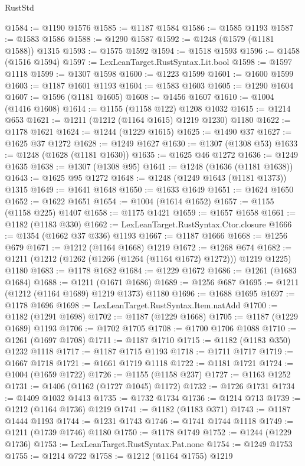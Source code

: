 \begin{lexlean}{RustStd}
\begin{coremodule}
{\begin{coremodule}
{{{{{{{{{{{{{{{{{{{{{{{{{{{{{{{{@1584 := @1190 @1576
@1585 := @1187 @1584
@1586 := @1585 @1193
@1587 := @1583 @1586
@1588 := @1290 @1587
@1592 := @1248 (@1579 (@1181 @1588)) @1315
@1593 := @1575 @1592
@1594 := @1518 @1593
@1596 := @1458 (@1516 @1594)
@1597 := LexLeanTarget.RustSyntax.Lit.bool
@1598 := @1597 @1118
@1599 := @1307 @1598
@1600 := @1223 @1599
@1601 := @1600 @1599
@1603 := @1187 @1601 @1193
@1604 := @1583 @1603
@1605 := @1290 @1604
@1607 := @1596 (@1181 @1605)
@1608 := @1456 @1607
@1610 := @1004 (@1416 @1608)
@1614 := @1155 (@1158 @122) @1208 @1032
@1615 := @1214 @653
@1621 := @1211 (@1212 (@1164 @1615) @1219 @1230) @1180
@1622 := @1178 @1621
@1624 := @1244 (@1229 @1615)
@1625 := @1490 @37
@1627 := @1625 @37 @1272
@1628 := @1249 @1627
@1630 := @1307 (@1308 @53)
@1633 := @1248 (@1628 (@1181 @1630))
@1635 := @1625 @46 @1272
@1636 := @1249 @1635
@1638 := @1307 (@1308 @95)
@1641 := @1248 (@1636 (@1181 @1638))
@1643 := @1625 @95 @1272
@1648 := @1248 (@1249 @1643 (@1181 @1373)) @1315
@1649 := @1641 @1648
@1650 := @1633 @1649
@1651 := @1624 @1650
@1652 := @1622 @1651
@1654 := @1004 (@1614 @1652)
@1657 := @1155 (@1158 @225) @1407
@1658 := @1175 @1421
@1659 := @1657 @1658
@1661 := @1182 (@1183 @330)
@1662 := LexLeanTarget.RustSyntax.Ctor.closure
@1666 := @1354 (@1662 @37 @336) @1193
@1667 := @1187 @1666
@1668 := @1256 @679
@1671 := @1212 (@1164 @1668) @1219
@1672 := @1268 @674
@1682 := @1211 (@1212 (@1262 (@1266 (@1264 (@1164 @1672) @1272))) @1219 @1225) @1180
@1683 := @1178 @1682
@1684 := @1229 @1672
@1686 := @1261 (@1683 @1684)
@1688 := @1211 (@1671 @1686)
@1689 := @1256 @687
@1695 := @1211 (@1212 (@1164 @1689) @1219 @1373) @1180
@1696 := @1688 @1695
@1697 := @1178 @1696
@1698 := LexLeanTarget.RustSyntax.Item.natAdd
@1700 := @1182 (@1291 @1698)
@1702 := @1187 (@1229 @1668)
@1705 := @1187 (@1229 @1689) @1193
@1706 := @1702 @1705
@1708 := @1700 @1706 @1088
@1710 := @1261 (@1697 @1708)
@1711 := @1187 @1710
@1715 := @1182 (@1183 @350) @1232 @1118
@1717 := @1187 @1715 @1193
@1718 := @1711 @1717
@1719 := @1667 @1718
@1721 := @1661 @1719 @1118
@1722 := @1181 @1721
@1724 := @1004 (@1659 @1722)
@1726 := @1155 (@1158 @237)
@1727 := @1163 @1252
@1731 := @1406 (@1162 (@1727 @1045) @1172)
@1732 := @1726 @1731
@1734 := @1409 @1032 @1413
@1735 := @1732 @1734
@1736 := @1214 @713
@1739 := @1212 (@1164 @1736) @1219
@1741 := @1182 (@1183 @371)
@1743 := @1187 @1444 @1193
@1744 := @1231 @1743
@1746 := @1741 @1744 @1118
@1749 := @1211 (@1739 @1746) @1180
@1750 := @1178 @1749
@1752 := @1244 (@1229 @1736)
@1753 := LexLeanTarget.RustSyntax.Pat.none
@1754 := @1249 @1753
@1755 := @1214 @722
@1758 := @1212 (@1164 @1755) @1219
}}}}}}}}}}}}}}}}}}}}}}}}}}}}}}}}
\end{coremodule}}
\end{coremodule}
\end{lexlean}

